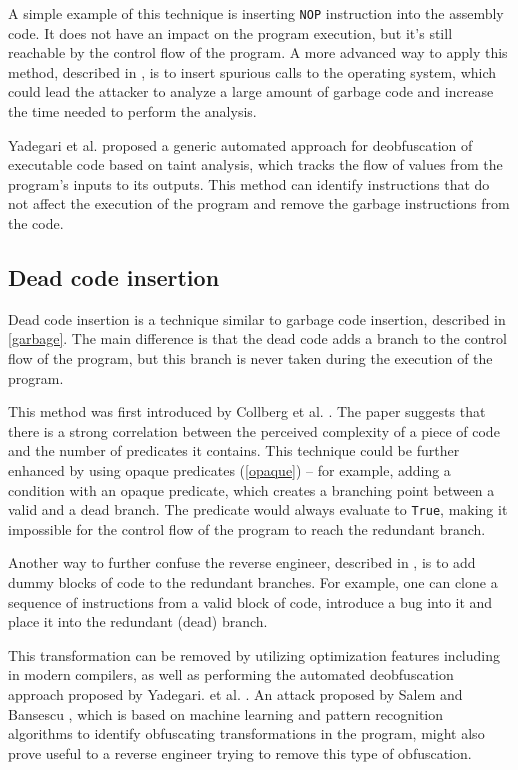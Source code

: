 \documentclass[
  digital, %
  notable,   %
  twoside, %
  nolof,     %
  nolot,     %
]{fithesis3}
\theoremstyle{definition}
\begin{document}
A simple example of this technique is inserting \texttt{NOP} instruction into the assembly code. It does not have an impact on the program execution, but it's still reachable by the control flow of the program. A more advanced way to apply this method, described in \cite{os_protection}, is to insert spurious calls to the operating system, which could lead the attacker to analyze a large amount of garbage code and increase the time needed to perform the analysis. 

Yadegari et al. \cite{generic_deobfuscation} proposed a generic automated approach for deobfuscation of executable code based on taint analysis, which tracks the flow of values from the program's inputs to its outputs. This method can identify instructions that do not affect the execution of the program and remove the garbage instructions from the code. 

\subsection{Dead code insertion} \label{dead}
Dead code insertion is a technique similar to garbage code insertion, described in \ref{garbage}. The main difference is that the dead code adds a branch to the control flow of the program, but this branch is never taken during the execution of the program. 

This method was first introduced by Collberg et al. \cite{taxonomy_obf}. The paper suggests that there is a strong correlation between the perceived complexity of a piece of code and the number of predicates it contains. This technique could be further enhanced by using opaque predicates (\ref{opaque}) -- for example, adding a condition with an opaque predicate, which creates a branching point between a valid and a dead branch. The predicate would always evaluate to \texttt{True}, making it impossible for the control flow of the program to reach the redundant branch. 

Another way to further confuse the reverse engineer, described in \cite{taxonomy_obf}, is to add dummy blocks of code to the redundant branches. For example, one can clone a sequence of instructions from a valid block of code, introduce a bug into it and place it into the redundant (dead) branch. 

This transformation can be removed by utilizing optimization features including in modern compilers, as well as performing the automated deobfuscation approach proposed by Yadegari. et al. \cite{generic_deobfuscation}. An attack proposed by Salem and Bansescu \cite{ml_deobfuscation}, which is based on machine learning and pattern recognition algorithms to identify obfuscating transformations in the program, might also prove useful to a reverse engineer trying to remove this type of obfuscation. 
\end{document}

